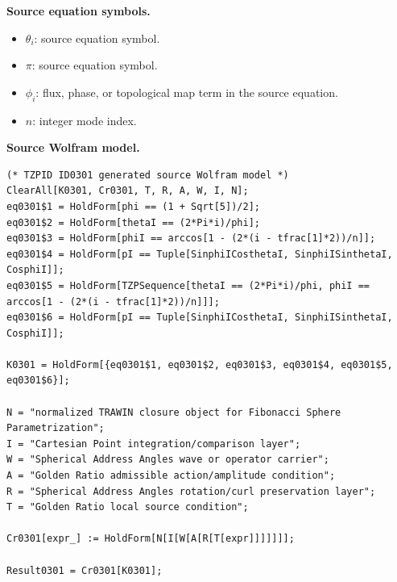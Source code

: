 \begin{minipage}[t]{0.49\linewidth}
\begingroup
\small
\raggedright
\textbf{Source equation symbols.}\par
\begin{itemize}[leftmargin=1.35em,itemsep=1pt,topsep=1pt,parsep=0pt]
    \item $\theta_i$: source equation symbol.
    \item $\pi$: source equation symbol.
    \item $\phi_i$: flux, phase, or topological map term in the source equation.
    \item $n$: integer mode index.
\end{itemize}
\endgroup
\end{minipage}\hfill
\begin{minipage}[t]{0.47\linewidth}
\begingroup
\scriptsize
\raggedright
\textbf{Source Wolfram model.}\par
\begin{Verbatim}[fontsize=\tiny,breaklines=true,breakanywhere=true]
(* TZPID ID0301 generated source Wolfram model *)
ClearAll[K0301, Cr0301, T, R, A, W, I, N];
eq0301$1 = HoldForm[phi == (1 + Sqrt[5])/2];
eq0301$2 = HoldForm[thetaI == (2*Pi*i)/phi];
eq0301$3 = HoldForm[phiI == arccos[1 - (2*(i - tfrac[1]*2))/n]];
eq0301$4 = HoldForm[pI == Tuple[SinphiICosthetaI, SinphiISinthetaI, CosphiI]];
eq0301$5 = HoldForm[TZPSequence[thetaI == (2*Pi*i)/phi, phiI == arccos[1 - (2*(i - tfrac[1]*2))/n]]];
eq0301$6 = HoldForm[pI == Tuple[SinphiICosthetaI, SinphiISinthetaI, CosphiI]];

K0301 = HoldForm[{eq0301$1, eq0301$2, eq0301$3, eq0301$4, eq0301$5, eq0301$6}];

N = "normalized TRAWIN closure object for Fibonacci Sphere Parametrization";
I = "Cartesian Point integration/comparison layer";
W = "Spherical Address Angles wave or operator carrier";
A = "Golden Ratio admissible action/amplitude condition";
R = "Spherical Address Angles rotation/curl preservation layer";
T = "Golden Ratio local source condition";

Cr0301[expr_] := HoldForm[N[I[W[A[R[T[expr]]]]]]];

Result0301 = Cr0301[K0301];
\end{Verbatim}
\endgroup
\end{minipage}

